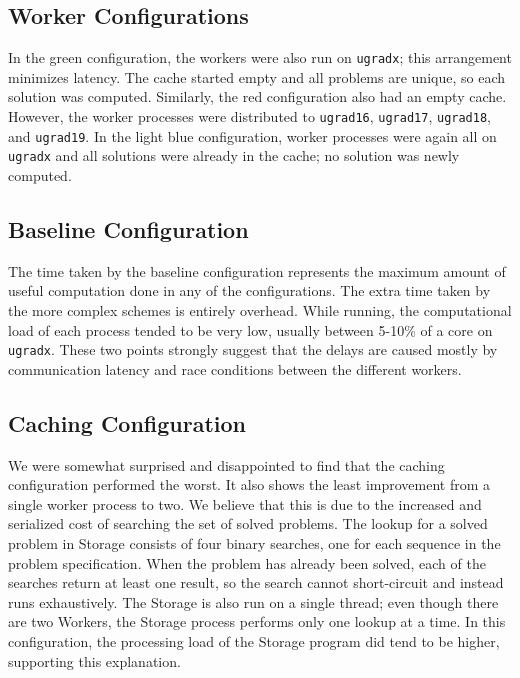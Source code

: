\documentclass[12pt]{article}
\begin{document}
\subsection{Worker Configurations}
In the green configuration, the workers were also run on \verb!ugradx!; this arrangement minimizes latency.
The cache started empty and all problems are unique, so each solution was computed.
Similarly, the red configuration also had an empty cache.
However, the worker processes were distributed to \verb!ugrad16!, \verb!ugrad17!, \verb!ugrad18!, and \verb!ugrad19!.
In the light blue configuration, worker processes were again all on \verb!ugradx! and all solutions were already in the cache; no solution was newly computed.

\subsection{Baseline Configuration}
The time taken by the baseline configuration represents the maximum amount of useful computation done in any of the configurations.
The extra time taken by the more complex schemes is entirely overhead.
While running, the computational load of each process tended to be very low, usually between 5-10\% of a core on \verb!ugradx!.
These two points strongly suggest that the delays are caused mostly by communication latency and race conditions between the different workers.

\subsection{Caching Configuration}
We were somewhat surprised and disappointed to find that the caching configuration performed the worst.
It also shows the least improvement from a single worker process to two.
We believe that this is due to the increased and serialized cost of searching the set of solved problems.
The lookup for a solved problem in Storage consists of four binary searches, one for each sequence in the problem specification.
When the problem has already been solved, each of the searches return at least one result, so the search cannot short-circuit and instead runs exhaustively.
The Storage is also run on a single thread; even though there are two Workers, the Storage process performs only one lookup at a time.
In this configuration, the processing load of the Storage program did tend to be higher, supporting this explanation.
\end{document}
